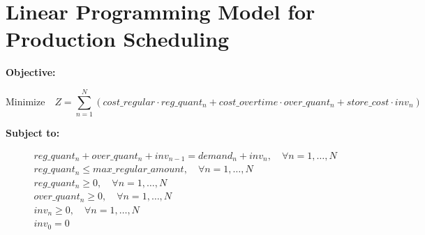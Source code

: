 \documentclass{article}
\begin{document}
\section*{Linear Programming Model for Production Scheduling}

\textbf{Objective:}

\[
\text{Minimize} \quad Z = \sum_{n=1}^{N} \left( cost\_regular \cdot reg\_quant_n + cost\_overtime \cdot over\_quant_n + store\_cost \cdot inv_n \right)
\]

\textbf{Subject to:}

\begin{align*}
& reg\_quant_n + over\_quant_n + inv_{n-1} = demand_n + inv_n, \quad \forall n = 1, \ldots, N \\
& reg\_quant_n \leq max\_regular\_amount, \quad \forall n = 1, \ldots, N \\
& reg\_quant_n \geq 0, \quad \forall n = 1, \ldots, N \\
& over\_quant_n \geq 0, \quad \forall n = 1, \ldots, N \\
& inv_n \geq 0, \quad \forall n = 1, \ldots, N \\
& inv_0 = 0
\end{align*}
\end{document}
